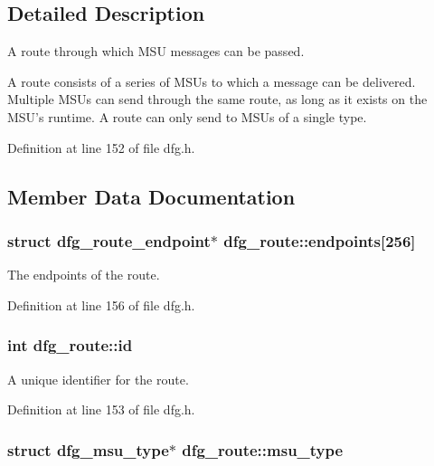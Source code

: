 \subsection{Detailed Description}
A route through which M\-S\-U messages can be passed. 

A route consists of a series of M\-S\-Us to which a message can be delivered. Multiple M\-S\-Us can send through the same route, as long as it exists on the M\-S\-U's runtime. A route can only send to M\-S\-Us of a single type. 

Definition at line 152 of file dfg.\-h.



\subsection{Member Data Documentation}
\hypertarget{structdfg__route_a6e4febfc25853befadf7dc64de1b7cff}{
\subsubsection[{endpoints}]{\setlength{\rightskip}{0pt plus 5cm}struct {\bf dfg\-\_\-route\-\_\-endpoint}$\ast$ dfg\-\_\-route\-::endpoints\mbox{[}256\mbox{]}}}\label{structdfg__route_a6e4febfc25853befadf7dc64de1b7cff}


The endpoints of the route. 



Definition at line 156 of file dfg.\-h.

\hypertarget{structdfg__route_aade838574772b19aa4c562f818a04c4a}{
\subsubsection[{id}]{\setlength{\rightskip}{0pt plus 5cm}int dfg\-\_\-route\-::id}}\label{structdfg__route_aade838574772b19aa4c562f818a04c4a}


A unique identifier for the route. 



Definition at line 153 of file dfg.\-h.

\hypertarget{structdfg__route_abfa4b2c8836a5db1b78c1f64c84f7221}{
\subsubsection[{msu\-\_\-type}]{\setlength{\rightskip}{0pt plus 5cm}struct {\bf dfg\-\_\-msu\-\_\-type}$\ast$ dfg\-\_\-route\-::msu\-\_\-type}}\label{structdfg__route_abfa4b2c8836a5db1b78c1f64c84f7221}


